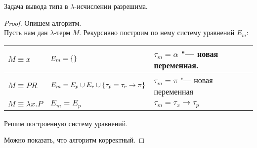 \begin{theorem}
    Задача вывода типа в $\lambda$-исчислении разрешима.
\end{theorem}

\begin{proof}
    Опишем алгоритм. \\
    Пусть нам дан $\lambda$-терм $M$. Рекурсивно построим по нему систему уравнений $E_m$:
    \begin{center}
    \begin{tabular}{l l l} \toprule
        $M \equiv x$ & $E_m=\left\{\right\}$ & $\tau_m=\alpha$ "--- новая переменная. \\ \midrule
        $M \equiv PR$ & $E_m=E_p \cup E_r \cup \left\{\tau_p=\tau_r\rightarrow\pi\right\}$ & $\tau_m=\pi$ "--- новая переменная \\ \midrule
        $M \equiv \lambda x . P$ & $E_m=E_p$ & $\tau_m=\tau_x\rightarrow\tau_p$ \\ \bottomrule
    \end{tabular}
    \end{center}
    Решим построенную систему уравнений.

    Можно показать, что алгоритм корректный.
\end{proof}


%
